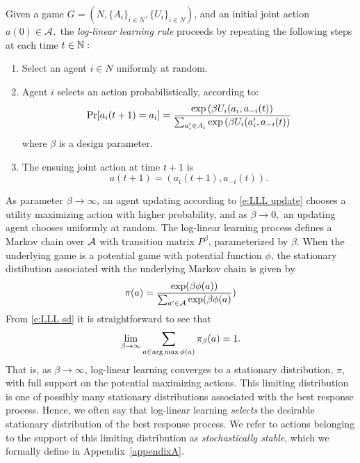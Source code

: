 \begin{defn}
Given a game $G = \left(N,\{A_i\}_{i\in N}, \{U_i\}_{i\in N}\right)$, and an initial joint action $a(0)\in\mathcal{A},$ the {\it log-linear learning rule} proceeds by repeating the following steps at each time $t\in \N:$
\begin{enumerate}
    \item Select an agent $i\in N$ uniformly at random.
    \item Agent $i$ selects an action probabilistically, according to:
    \begin{equation}\label{e:LLL update}
        \Pr[a_i(t+1) = a_i] = {\exp\left(\beta U_i(a_i,a_{-i}(t)\right)\over
    \sum_{a_i^\prime\in A_i} \exp\left(\beta U_i(a_i^\prime,a_{-i}(t)\right)}
    \end{equation} 
    where $\beta$ is a design parameter.
    \item The ensuing joint action at time $t+1$ is $$a(t+1) = \left(a_i(t+1),a_{-i}(t)\right).$$
\end{enumerate}

\end{defn}

As parameter $\beta\to\infty$, an agent updating according to \eqref{e:LLL update} chooses a utility maximizing action with higher probability, and as $\beta\to 0,$ an updating agent chooses uniformly at random. The log-linear learning process defines a Markov chain over $\cal{A}$ with transition matrix $P^\beta$, parameterized by $\beta$. When the underlying game is a potential game with potential function $\phi$, the stationary distibution associated with the underlying Markov chain is given by 
\begin{equation}\label{e:LLL sd}
    \pi(a) = {\exp (\beta \phi(a))\over \sum_{a^\prime\in \cal{A}} \exp(\beta \phi(a)})
\end{equation}
From \eqref{e:LLL sd} it is straightforward to see that 
\begin{equation}
    \lim_{\beta\to\infty} \sum_{a\in \argmax \phi(a)} \pi_\beta(a) = 1.
\end{equation}
That is, as $\beta\to\infty$, log-linear learning converges to a stationary distribution, $\pi$, with full support on the potential maximizing actions. This limiting distribution is one of possibly many stationary distributions associated with the best response process. Hence, we often say that log-linear learning {\it selects} the desirable stationary distribution of the best response process. We refer to actions belonging to the support of this limiting distribution as {\it stochastically stable}, which we formally define in Appendix~\ref{appendixA}.



